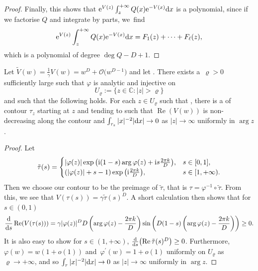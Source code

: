 \begin{proof}
Finally, this shows that ${\rm e}^{V(z)} \int_z^{+\infty} Q(x) {\rm e}^{-V(x)} {\rm d}x$ is a polynomial, since if we factorise $Q$ and integrate by parts, we~find
\begin{equation*}
{\rm e}^{V(z)} \int_z^{+\infty} Q(x) {\rm e}^{-V(x)} {\rm d}x = F_1(z) + \dots + F_\ell(z),
\end{equation*}
which is a polynomial of degree $\deg Q - D + 1$.
\end{proof}

\begin{Lemma}\label{contour} Let $\tilde{V}(w) = \frac{1}{\gamma}V(w) = w^D + \mathcal{O}\big(w^{D-1}\big)$ and let . There exists a~${\varrho > 0}$ sufficiently large such that $\varphi$ is analytic and injective on
\begin{equation*}
U_\varrho := \{ z \in \mathbb{C}\colon |z| > \varrho \}
\end{equation*}
and such that the following holds. For each $z \in U_\varrho$ such that
,
there is a of contour $\tau_z$ starting at $z$ and tending to  such that $\operatorname{Re} (V(w))$ is non-decreasing along the contour and $\int_{\tau_z}|x|^{-2} |{\rm d}x| \to 0$ as $|z| \to \infty$ uniformly in $\operatorname{arg} z$.
\end{Lemma}
\begin{proof}
Let
\begin{equation*}
\tilde{\tau} (s) =
\begin{cases}
 |\varphi(z)| \exp\big({\rm i} (1-s)\arg \varphi(z) + {\rm i}s\frac{2\pi k}{D} \big), & s \in [0,1] ,\\
 (|\varphi(z)|+s-1) \exp\big({\rm i} \frac{2\pi k}{D} \big), & s \in [1,+\infty). \\
\end{cases}
\end{equation*}
Then we choose our contour to be the preimage of $\tilde{\tau}$, that is $\tau= \varphi^{-1} \circ \tilde{\tau}$. From this, we see that $V(\tau(s)) = \gamma \tilde{\tau}(s)^D$. A short calculation then shows that for $s \in (0,1)$
\begin{equation*}
\frac{\rm d}{{\rm d}s} \operatorname{Re} (V(\tau(s))) = \gamma |\varphi(z)|^D D \left( \arg \varphi(z) - \frac{2\pi k}{D} \right) \sin\left( D (1-s) \left( \arg \varphi(z) - \frac{2\pi k}{D} \right) \right) \geq 0.
\end{equation*}
It is also easy to show for $s \in (1,+\infty)$, $\frac{\rm d}{{\rm d}s} \bigl(\operatorname{Re} \tilde{\tau}(s)^D\bigr) \geq 0$. Furthermore, $\varphi(w) = w (1+o(1))$ and~${\varphi^\prime(w) = 1+o(1)}$ uniformly on $U_\varrho$ as $\varrho \to +\infty$, and so $\int_\tau |x|^{-2} |{\rm d}x| \to 0$ as $|z| \to \infty$ uniformly in $\operatorname{arg} z$.
\end{proof}

